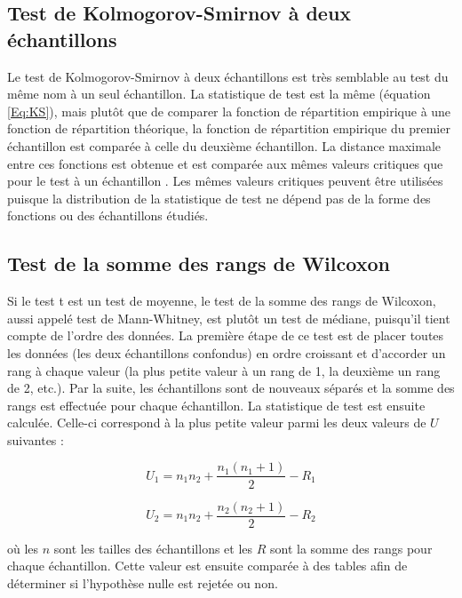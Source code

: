 \documentclass{article}       %
\begin{document}
\subsection{Test de Kolmogorov-Smirnov à deux échantillons}

Le test de Kolmogorov-Smirnov à deux échantillons est très semblable au test du même nom à un seul échantillon. La statistique de test est la même (équation \ref{Eq:KS}), mais plutôt que de comparer la fonction de répartition empirique à une fonction de répartition théorique, la fonction de répartition empirique du premier échantillon est comparée à celle du deuxième échantillon. La distance maximale entre ces fonctions est obtenue et est comparée aux mêmes valeurs critiques que pour le test à un échantillon \cite{TwoSampKS}. Les mêmes valeurs critiques peuvent être utilisées puisque la distribution de la statistique de test ne dépend pas de la forme des fonctions ou des échantillons étudiés.

\subsection{Test de la somme des rangs de Wilcoxon}

Si le test t est un test de moyenne, le test de la somme des rangs de Wilcoxon, aussi appelé test de Mann-Whitney, est plutôt un test de médiane, puisqu'il tient compte de l'ordre des données. La première étape de ce test est de placer toutes les données (les deux échantillons confondus) en ordre croissant et d'accorder un rang à chaque valeur (la plus petite valeur à un rang de 1, la deuxième un rang de 2, etc.). Par la suite, les échantillons sont de nouveaux séparés et la somme des rangs est effectuée pour chaque échantillon. La statistique de test est ensuite calculée. Celle-ci correspond à la plus petite valeur parmi les deux valeurs de 
$U$ suivantes \cite{WRS}:

\begin{equation*}
    U_{1} = n_{1}n_{2} + \frac{n_{1}(n_{1}+1)}{2} - R_{1}
\end{equation*}

\begin{equation*}
    U_{2} = n_{1}n_{2} + \frac{n_{2}(n_{2}+1)}{2} - R_{2}
\end{equation*}

où les $n$ sont les tailles des échantillons et les $R$ sont la somme des rangs pour chaque échantillon. Cette valeur est ensuite comparée à des tables afin de déterminer si l'hypothèse nulle est rejetée ou non.
\end{document}
